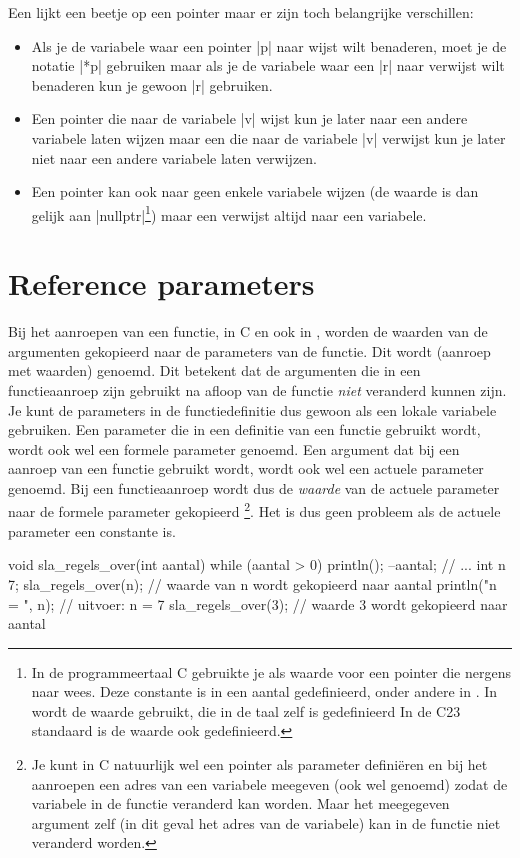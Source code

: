 \begin{cpplstShortInline}
Een  lijkt een beetje op een pointer maar er zijn toch belangrijke verschillen: 
\begin{itemize}
    \item Als je de variabele waar een pointer |p| naar wijst wilt benaderen, moet je de notatie |*p| gebruiken maar als je de variabele waar een  |r| naar verwijst wilt benaderen kun je gewoon |r| gebruiken.
    \item Een pointer die naar de variabele |v| wijst kun je later naar een andere variabele laten wijzen maar een  die naar de variabele |v| verwijst kun je later niet naar een andere variabele laten verwijzen.
    \item Een pointer kan ook naar geen enkele variabele wijzen (de waarde is dan gelijk aan |nullptr|\footnote{%
		\label{nullptr}
    	In de programmeertaal C gebruikte je  als waarde voor een pointer die nergens naar wees.
    	Deze constante is in een aantal  gedefinieerd, onder andere in .
    	In \Cpp{} wordt de waarde  gebruikt, die in de taal zelf is gedefinieerd
		In de C23 standaard is de waarde  ook gedefinieerd.
	}) maar een  verwijst altijd naar een variabele.
\end{itemize}

\section{Reference parameters}
\label{sec:referenceparameters}
Bij het aanroepen van een functie, in C en ook in \Cpp{}, worden de waarden van de argumenten gekopieerd naar de parameters van de functie. 
Dit wordt \label{call by value}\emph{} (aanroep met waarden) genoemd. 
Dit betekent dat de argumenten die in een functieaanroep zijn gebruikt na afloop van de functie \emph{niet} veranderd kunnen zijn. 
Je kunt de parameters in de functiedefinitie dus gewoon als een lokale variabele gebruiken. 
Een parameter die in een definitie van een functie gebruikt wordt, wordt ook wel een formele parameter genoemd. 
Een argument dat bij een aanroep van een functie gebruikt wordt, wordt ook wel een actuele parameter genoemd. 
Bij een functieaanroep wordt dus de \emph{waarde} van de actuele parameter naar de formele parameter gekopieerd%
\footnote{%
    Je kunt in C natuurlijk wel een pointer als parameter definiëren en bij het aanroepen een adres van een variabele meegeven (ook wel \emph{} genoemd) zodat de variabele in de functie veranderd kan worden. 
    Maar het meegegeven argument zelf (in dit geval het adres van de variabele) kan in de functie niet veranderd worden.
}. 
Het is dus geen probleem als de actuele parameter een constante is.
\begin{cpplstfragment}
void sla_regels_over(int aantal) {
    while (aantal > 0) {
        println();
        --aantal;
    }
}
//  ...
    int n {7};
    sla_regels_over(n); // waarde van n wordt gekopieerd naar aantal
    println("n = {}", n); // uitvoer: n = 7
    sla_regels_over(3); // waarde 3 wordt gekopieerd naar aantal
\end{cpplstfragment}


\end{cpplstShortInline}
